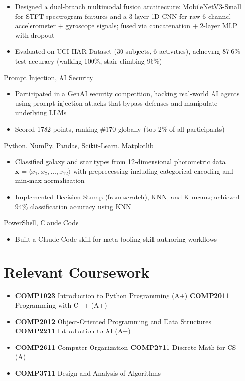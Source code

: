\documentclass{common/resume}
\begin{document}
\begin{itemize}
  \item Designed a dual-branch multimodal fusion architecture: MobileNetV3-Small for STFT spectrogram features and a 3-layer 1D-CNN for raw 6-channel accelerometer + gyroscope signals; fused via concatenation + 2-layer MLP with dropout
  \item Evaluated on UCI HAR Dataset (30 subjects, 6 activities), achieving 87.6\% test accuracy (walking 100\%, stair-climbing 96\%)
\end{itemize}

  {Prompt Injection, AI Security}

\begin{itemize}
  \item Participated in a GenAI security competition, hacking real-world AI agents using prompt injection attacks that bypass defenses and manipulate underlying LLMs
  \item Scored 1782 points, ranking \#170 globally (top 2\% of all participants)
\end{itemize}

  {Python, NumPy, Pandas, Scikit-Learn, Matplotlib}

\begin{itemize}
  \item Classified galaxy and star types from 12-dimensional photometric data $\mathbf{x} = \langle x_1, x_2, \ldots, x_{12} \rangle$ with preprocessing including categorical encoding and min-max normalization
  \item Implemented Decision Stump (from scratch), KNN, and K-means; achieved 94\% classification accuracy using KNN
\end{itemize}

  {PowerShell, Claude Code}

\begin{itemize}
  \item Built a Claude Code skill for meta-tooling skill authoring workflows
\end{itemize}

\section{Relevant Coursework}

\begin{itemize}
  \item \textbf{COMP1023} Introduction to Python Programming (A+) \hfill \textbf{COMP2011} Programming with C++ (A+)
  \item \textbf{COMP2012} Object-Oriented Programming and Data Structures \hfill \textbf{COMP2211} Introduction to AI (A+)
  \item \textbf{COMP2611} Computer Organization \hfill \textbf{COMP2711} Discrete Math for CS (A)
  \item \textbf{COMP3711} Design and Analysis of Algorithms
\end{itemize}
\end{document}
